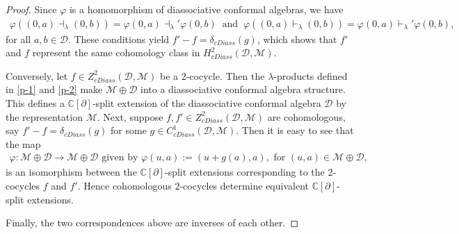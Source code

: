 \documentclass[a4paper,reqno,10pt]{amsart}
\theoremstyle{plain}
\theoremstyle{definition}
\theoremstyle{remark}
\newcommand{\D}{\mathcal{D}}
\newcommand{\M}{\mathcal{M}}
\newcommand{\la}{\lambda}
\begin{document}
\begin{proof}
Since $\varphi$ is a homomorphism of diassociative conformal algebras, we have
\begin{align*}
\varphi ((0,a)\dashv_{\la}(0,b) )
=
\varphi  (0,a)\dashv_{\la}' \varphi (0,b)~
\text{ and }~
\varphi ((0,a)\vdash_{\la}(0,b) )
=
\varphi (0,a)\vdash_{\la}' \varphi (0,b ),
\end{align*}
for all $a, b \in \D$. These conditions yield $f'-f=\delta_{cDiass}(g)$, which shows that $f'$ and $f$ represent the same cohomology class in $H_{cDiass}^{2}(\D,\M)$.

\medskip

Conversely, let $f\in Z_{cDiass}^{2}(\D,\M)$ be a $2$-cocycle. Then the $\la$-products defined in \eqref{p-1} and \eqref{p-2} make $\M\oplus\D$ into a diassociative conformal algebra structure. This defines a $\mathbb{C}[\partial]$-split extension of the diassociative conformal algebra $\D$ by the representation $\M$. Next, suppose $f, f' \in  Z_{cDiass}^{2}(\D,\M)$ are cohomologous, say $ f'- f = \delta_{cDiass}(g)$ for some $g\in C_{cDiass}^{1}(\D,\M)$. Then it is easy to see that the map
\begin{align*}
\varphi: \M\oplus\D\longrightarrow\M\oplus\D  \text{ given by }
\varphi(u, a) :=(u+g(a),a), \text{ for } (u, a) \in \M \oplus \D,
\end{align*}
is an isomorphism between the $\mathbb{C}[\partial]$-split extensions corresponding to the 2-cocycles $f$ and $f'$. Hence cohomologous $2$-cocycles determine equivalent $\mathbb{C}[\partial]$-split extensions. 

Finally, the two correspondences above are inverses of each other.
\end{proof}
\end{document}
